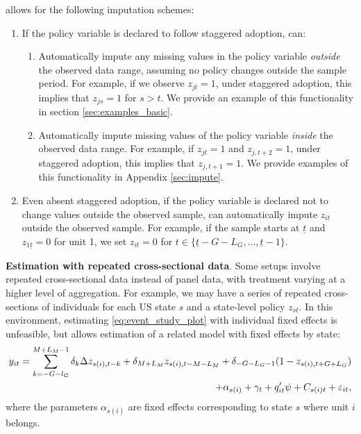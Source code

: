 \documentclass[12pt]{article}
\begin{document}
\xtevent allows for the following imputation schemes:
\begin{enumerate}
	\item If the policy variable is declared to follow staggered adoption, \xtevent can:
	\begin{enumerate}
		\item Automatically impute any missing values in the policy variable \textit{outside} the observed data range, assuming no policy changes outside the sample period.
		For example, if we observe $z_{jt}=1$, under staggered adoption, this implies that $z_{js}=1$ for $s>t$.
		We provide an example of this functionality in section \ref{sec:examples_basic}.
		\item Automatically impute missing values of the policy variable \textit{inside} the observed data range. For example, if $z_{jt} = 1$ and $z_{j,t+2} = 1$, under staggered adoption, this implies that $z_{j,t+1} = 1$. We provide examples of this functionality in Appendix \ref{sec:impute}.
	\end{enumerate}
	\item
	Even absent staggered adoption, if the policy variable is declared not to change values outside the observed sample, \xtevent can automatically impute $z_{it}$ outside the observed sample.
	For example, if the sample starts at $\underline{t}$ and $z_{1\underline{t}} = 0$ for unit 1, we set $z_{it} = 0$ for $t \in \{ \underline{t} - G - L_G, ..., \underline{t}-1 \}$.
\end{enumerate}


\noindent \textbf{Estimation with repeated cross-sectional data}. Some setups involve repeated cross-sectional data instead of panel data, with treatment varying at a higher level of aggregation. For example, we may have a series of repeated cross-sections of individuals for each US state $s$ and a state-level policy $z_{st}$. In this environment, estimating \eqref{eq:event_study_plot} with individual fixed effects is unfeasible, but \xtevent allows estimation of a related model with fixed effects by state:
\begin{equation}\label{eq:repeatedcs}
\begin{split}
y_{it} = \sum_{k=-G-l_G}^{M+L_M -1}\delta_k \Delta  z_{s(i),t-k} + \delta_{M+L_M} z_{s(i),t-M-L_M} + \delta_{-G-L_G-1}(1-z_{s(i),t+G+L_G})
\\ \centering
+ \alpha_{s(i)} + \gamma_{t} + q'_{it}\psi + C_{s(i)t} + \varepsilon_{it},
\end{split}
\end{equation}
where the parameters $\alpha_{s(i)}$ are fixed effects corresponding to state $s$ where unit $i$ belongs.
\end{document}
